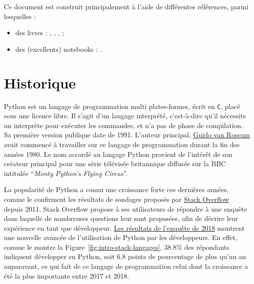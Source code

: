 \documentclass[
  12pt,
]{book}
\providecommand{\tightlist}{%
  \setlength{\itemsep}{0pt}\setlength{\parskip}{0pt}}
\numberwithin{equation}{section}
\numberwithin{countremarque}{section}
\begin{document}
Ce document est construit principalement à l'aide de différentes références, parmi lesquelles :

\begin{itemize}
\tightlist
\item
  des livres : \citet{briggs_2013_python}, \citet{grus_2015_data}, \citet{vanderplas2016python}, \citet{mckinney_2017_python} ;
\item
  des (excellents) notebooks : \citet{navaro_python}.
\end{itemize}

\section{Historique}\label{historique}

Python est un langage de programmation multi plates-formes, écrit en \texttt{C}, placé sous une licence libre. Il s'agit d'un langage interprété, c'est-à-dire qu'il nécessite un interprète pour exécuter les commandes, et n'a pas de phase de compilation. Sa première version publique date de 1991. L'auteur principal, \href{https://en.wikipedia.org/wiki/Guido_van_Rossum}{Guido van Rossum} avait commencé à travailler sur ce langage de programmation durant la fin des années 1980. Le nom accordé au langage Python provient de l'intérêt de son créateur principal pour une série télévisée britannique diffusée sur la BBC intitulée ``\emph{Monty Python's Flying Circus}''.

La popularité de Python a connu une croissance forte ces dernières années, comme le confirment les résultats de sondages proposés par \href{https://stackoverflow.com/}{Stack Overflow} depuis 2011. Stack Overflow propose à ses utilisateurs de répondre à une enquête dans laquelle de nombreuses questions leur sont proposées, afin de décrire leur expérience en tant que développeur. \href{https://insights.stackoverflow.com/survey/2018\#technology}{Les résultats de l'enquête de 2018} montrent une nouvelle avancée de l'utilisation de Python par les développeurs. En effet, comme le montre la Figure~\ref{fig:intro-stack-langages}, 38.8\% des répondants indiquent développer en Python, soit 6.8 points de pourcentage de plus qu'un an auparavant, ce qui fait de ce langage de programmation celui dont la croissance a été la plus importante entre 2017 et 2018.
\end{document}
